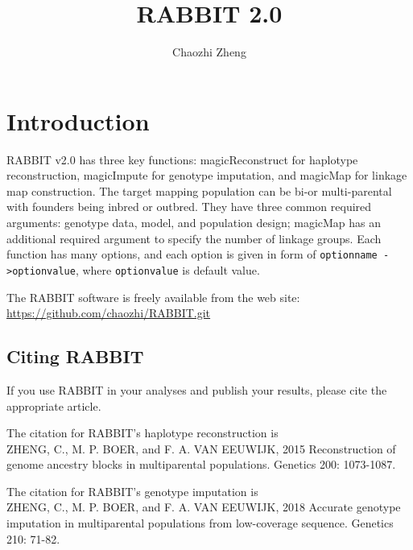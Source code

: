 \documentclass[12pt]{article}
\begin{document}
\title{RABBIT 2.0}
\author{Chaozhi Zheng \\
  }
\maketitle
\thispagestyle{empty}

\clearpage

\tableofcontents

\newpage

\section{Introduction}

RABBIT v2.0 has three key functions: magicReconstruct for haplotype reconstruction, magicImpute for genotype imputation, and magicMap for linkage map construction. The target mapping population can be bi-or multi-parental with founders being inbred or outbred. They have three common required arguments: genotype data, model, and population design; magicMap has an additional required argument to specify the number of linkage groups. Each function has many options, and each option is given in form of \verb|optionname ->optionvalue|, where \verb|optionvalue| is default value. 

The RABBIT software is freely available from the web site: \url{https://github.com/chaozhi/RABBIT.git}

\subsection{Citing RABBIT}
If you use RABBIT in your analyses and publish your results, please cite the appropriate article. 

\vspace{12pt}
The citation for RABBIT's haplotype reconstruction is \\
ZHENG, C., M. P. BOER, and F. A. VAN EEUWIJK, 2015 Reconstruction of genome ancestry blocks in multiparental populations. Genetics 200: 1073-1087.

\vspace{12pt}
The citation for RABBIT's genotype imputation is \\
ZHENG, C., M. P. BOER, and F. A. VAN EEUWIJK, 2018 Accurate genotype imputation in multiparental populations from low-coverage sequence. Genetics 210: 71-82.
\end{document}
